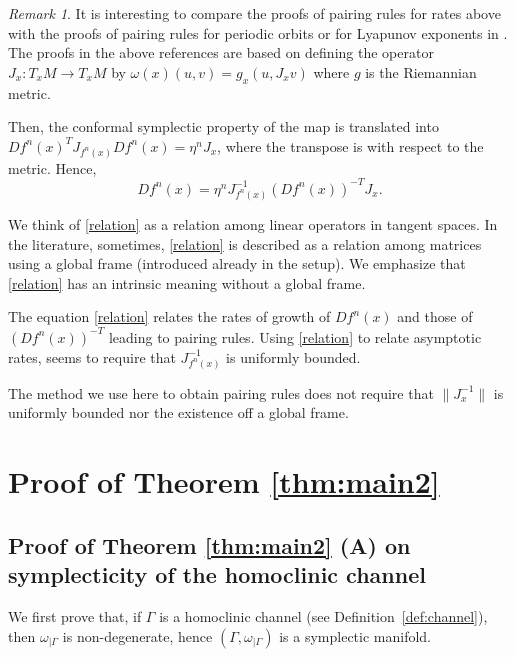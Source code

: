 \documentclass[11pt]{amsart}
\theoremstyle{definition}
\theoremstyle{remark}
\newtheorem{rem}[thm]{Remark}
\numberwithin{equation}{section}
\begin{document}
\begin{rem}
  It is interesting to compare the proofs of pairing rules for rates
  above with the proofs of pairing rules for periodic orbits or
  for Lyapunov exponents in
  \cite{Dessler88,dettmann1996proof,wojtkowski1998conformally}.
  The proofs in the above references  are based on defining the operator
  $J_x: T_xM \rightarrow T_x M$ by
  $\omega(x)(u,v) = g_x(u, J_x v) $ where $g$ is the Riemannian metric.

  Then, the conformal symplectic property of the map  is translated into
  $ Df^n (x)^T J_{f^n(x)} Df^n(x)= \eta^n J_x$,
  where the transpose is with respect to the metric.
  Hence,
  \begin{equation}\label{relation}
    Df^n(x)  = \eta^{n}
    J^{-1}_{f^n(x)}  (Df^n (x))^{-T} J_x.
  \end{equation}


We think of \eqref{relation} as a relation
among linear operators in tangent spaces. In the literature,
sometimes, \eqref{relation}
is  described as a  relation among matrices using
a global frame (introduced already in the setup).
We emphasize that  \eqref{relation} has an intrinsic meaning
without a global frame.




  The equation \eqref{relation} relates  the
  rates of growth of $Df^n(x)$ and those of $(Df^n(x))^{-T}$
leading to pairing rules.
 Using \eqref{relation} to relate asymptotic rates,  seems to require
    that $J^{-1}_{f^n(x)}$ is uniformly bounded.

    The method we use here to obtain pairing rules  does not require
    that $\|J^{-1}_{x}\|$ is uniformly bounded nor the existence off a global frame.
  \end{rem}





\section{Proof of  Theorem \ref{thm:main2}}\label{sec:proof_main_2}


\subsection{Proof of Theorem \ref{thm:main2}  (A) on symplecticity of the homoclinic channel}


We first prove  that,
if $\Gamma$ is a homoclinic channel (see Definition~\ref{def:channel}), then
$\omega_{\mid\Gamma}$ is non-degenerate, hence
$(\Gamma,\omega_{\mid\Gamma})$ is a symplectic manifold.
\end{document}

